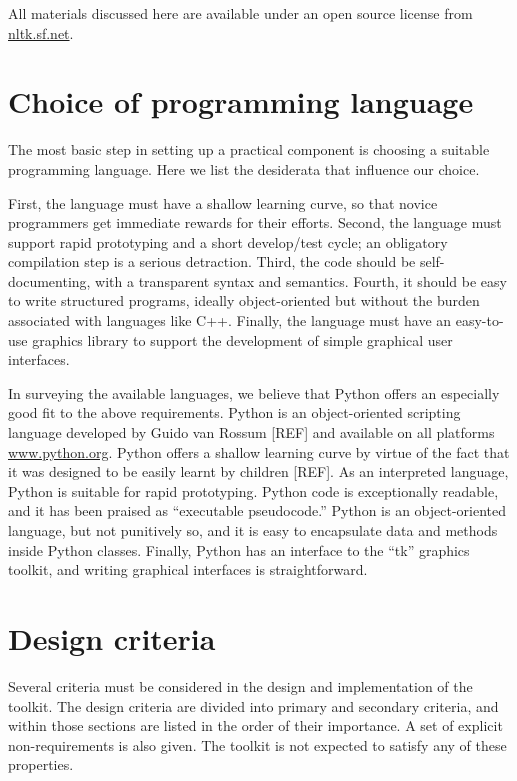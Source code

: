 \documentclass[11pt]{article}
\begin{document}
All materials discussed here are available under an open
source license from \url{nltk.sf.net}.

\section{Choice of programming language}

The most basic step in setting up a practical component is choosing a
suitable programming language.  Here we list the desiderata that influence
our choice.

First, the language must have a shallow learning curve, so that novice
programmers get immediate rewards for their efforts.
Second, the language must support rapid prototyping and a short develop/test cycle;
an obligatory compilation step is a serious detraction.
Third, the code should be self-documenting,
with a transparent syntax and semantics.
Fourth, it should be easy to write structured programs, ideally object-oriented
but without the burden associated with languages like C++.
Finally, the language must have an easy-to-use graphics library to support
the development of simple graphical user interfaces.

In surveying the available languages, we believe that Python offers an especially good
fit to the above requirements.  Python is an object-oriented scripting language
developed by Guido van Rossum [REF] and available on all platforms
\url{www.python.org}.
Python offers a shallow learning curve by virtue of the
fact that it was designed to be easily learnt by children [REF].
As an interpreted language, Python is suitable for rapid prototyping.
Python code is exceptionally readable, and it has been praised as
``executable pseudocode.''
Python is an object-oriented language, but not punitively so, and it
is easy to encapsulate data and methods inside Python classes.
Finally, Python has an interface to the ``tk'' graphics toolkit, and
writing graphical interfaces is straightforward.

\section{Design criteria}


Several criteria must be considered in the design and implementation
of the toolkit.  The design criteria are divided into primary and
secondary criteria, and within those sections are listed in the order
of their importance.  A set of explicit non-requirements is also
given.  The toolkit is not expected to satisfy any of these
properties. 
\end{document}
